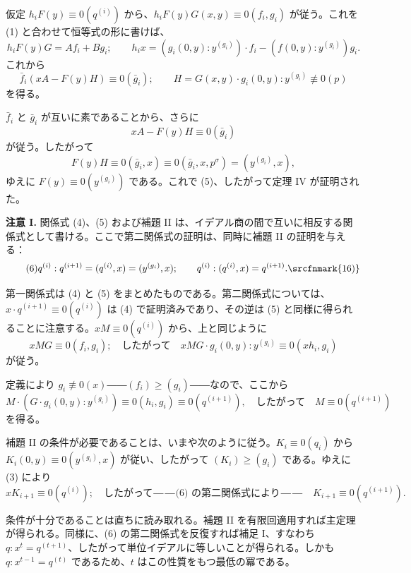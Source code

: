 仮定 \(h_iF(y)\equiv0(q^{(i)})\) から、\(h_iF(y)G(x,y)\equiv0(f_i,g_i)\) が従う。これを (1) と合わせて恒等式の形に書けば、
\[
h_iF(y)G=A f_i+B g_i;\qquad
h_ix=(g_i(0,y):y^{(g_i)})\cdot f_i
-(f(0,y):y^{(g_i)})g_i.
\]
これから
\[
\bar f_i(xA-F(y)H)\equiv0(\bar g_i);\qquad
H=G(x,y)\cdot g_i(0,y):y^{(g_i)}\not\equiv0(p)
\]
を得る。

\(\bar f_i\) と \(\bar g_i\) が互いに素であることから、さらに
\[
xA-F(y)H\equiv0(\bar g_i)
\]
が従う。したがって
\[
F(y)H\equiv0(\bar g_i,x)
\equiv0(\bar g_i,x,p^\sigma)=(y^{(g_i)},x),
\]
ゆえに \(F(y)\equiv0(y^{(g_i)})\) である。これで (5)、したがって定理 IV が証明された。

\textbf{注意 I.} 関係式 (4)、(5) および補題 II は、イデアル商の間で互いに相反する関係式として書ける。ここで第二関係式の証明は、同時に補題 II の証明を与える：
\begin{equation}
\tag{6}
q^{(i)}:q^{(i+1)}=(q^{(i)},x)=(y^{(g_i)},x);\qquad
q^{(i)}:(q^{(i)},x)=q^{(i+1)}.\srcfnmark{16)}
\end{equation}

第一関係式は (4) と (5) をまとめたものである。第二関係式については、\(x\cdot q^{(i+1)}\equiv0(q^{(i)})\) は (4) で証明済みであり、その逆は (5) と同様に得られることに注意する。\(xM\equiv0(q^{(i)})\) から、上と同じように
\[
xMG\equiv0(f_i,g_i);\quad\text{したがって}\quad
xMG\cdot g_i(0,y):y^{(g_i)}\equiv0(xh_i,g_i)
\]
が従う。

定義により \(g_i\not\equiv0(x)\)――\((f_i)\geq(g_i)\)――なので、ここから
\[
M\cdot(G\cdot g_i(0,y):y^{(g_i)})
\equiv0(h_i,g_i)\equiv0(q^{(i+1)}),
\quad\text{したがって}\quad M\equiv0(q^{(i+1)})
\]
を得る。

補題 II の条件が必要であることは、いまや次のように従う。\(K_i\equiv0(q_i)\) から \(K_i(0,y)\equiv0(y^{(g_i)},x)\) が従い、したがって \((K_i)\geq(g_i)\) である。ゆえに (3) により
\[
xK_{i+1}\equiv0(q^{(i)});\quad
\text{したがって――(6) の第二関係式により――}\quad
K_{i+1}\equiv0(q^{(i+1)}).
\]

条件が十分であることは直ちに読み取れる。補題 II を有限回適用すれば主定理が得られる。同様に、(6) の第二関係式を反復すれば補足 I、すなわち \(q:x^t=q^{(t+1)}\)、したがって単位イデアルに等しいことが得られる。しかも \(q:x^{t-1}=q^{(t)}\) であるため、\(t\) はこの性質をもつ最低の冪である。

